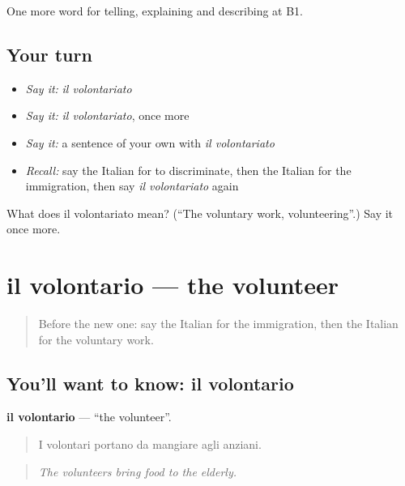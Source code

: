 \begin{grammarlens}[title={What you've built}]
One more word for telling, explaining and describing at B1.
\end{grammarlens}

\subsection*{Your turn}
\begin{itemize}
\raggedright
  \item \emph{Say it:} \emph{il volontariato}
  \item \emph{Say it:} \emph{il volontariato}, once more
  \item \emph{Say it:} a sentence of your own with \emph{il volontariato}
  \item \emph{Recall:} say the Italian for to discriminate, then the Italian for the immigration, then say \emph{il volontariato} again
\end{itemize}

\begin{tcolorbox}[breakable,colback=teal!4,colframe=teal!35!black,title={Before you move on}]
What does il volontariato mean? (\textquotedblleft{}The voluntary work, volunteering\textquotedblright{}.) Say it once more.
\end{tcolorbox}
\section[il volontario]{il volontario — the volunteer}

\label{lesson:IT-C367-volontario}



\begin{quote}
Before the new one: say the Italian for the immigration, then the Italian for the voluntary work.
\end{quote}

\subsection*{You'll want to know: il volontario}
\textbf{il volontario} — \textquotedblleft{}the volunteer\textquotedblright{}.

\begin{quote}
I volontari portano da mangiare agli anziani.
\end{quote}

\begin{quote}
\emph{The volunteers bring food to the elderly.}
\end{quote}

